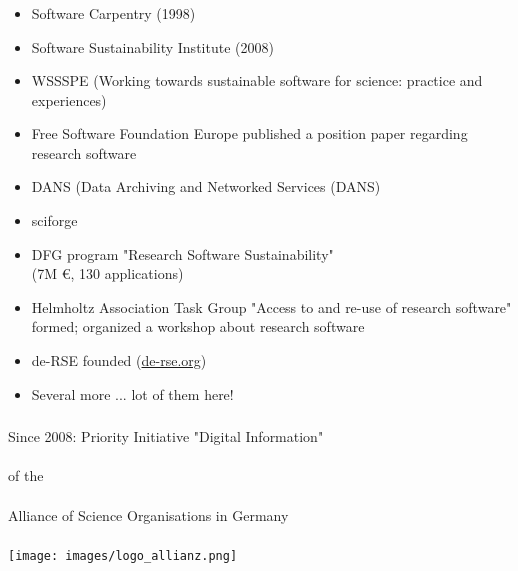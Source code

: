 \documentclass{beamer}
\begin{document}
\begin{frame}
  \frametitle{}
  \begin{block}{}
    {\normalsize
      \begin{itemize}
      \item Software Carpentry (1998)\pause
      \item Software Sustainability Institute (2008)\pause
      \item WSSSPE (Working towards sustainable software for science:
        practice and experiences)\pause
      \item Free Software Foundation Europe published a position paper
        regarding research software\pause
      \item DANS (Data Archiving and Networked Services (DANS)\pause
      \item sciforge\pause
      \item DFG program "Research Software Sustainability"\\
        (7M €, 130 applications)\pause
      \item Helmholtz Association Task Group "Access to and re-use of
        research software" formed; organized a workshop about
        research software\pause
      \item de-RSE founded (\href{http://de-rse.org}{de-rse.org})\pause
      \item Several more ... lot of them here!
    \end{itemize}
    }
  \end{block}
\end{frame}

\begin{frame}
  \frametitle{}
  \begin{center}
    Since 2008: Priority Initiative "Digital Information"\\  \ \\
    of the\\ \ \\
    Alliance of Science Organisations in Germany\\
    \ \\
    \texttt{[image: images/logo\_allianz.png]}\\
    \ \\
  \end{center}
\end{frame}
\end{document}
